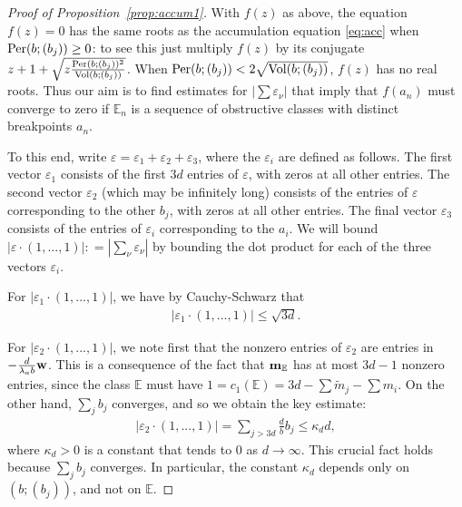 \documentclass[11pt, reqno]{amsart}
\theoremstyle{remark}
\numberwithin{equation}{subsection}
\numberwithin{figure}{section}
\theoremstyle{customremark}
\newcommand{\Vol}{{\rm Vol}}
\newcommand{\Per}{{\rm Per}}
\newcommand{\bbm}{{\bf m}}
\newcommand{\bw}{{\bf w}}
\newcommand{\Tm}{{\widetilde m}}
\newcommand{\bE}{{\mathbb E}}
\newcommand{\ka}{{\kappa}}
\newcommand{\la}{{\lambda}}
\newcommand{\eps}{\varepsilon}
\begin{document}
\begin{proof}[Proof of Proposition~\ref{prop:accum1}]
With $f(z)$ as above, the equation $f(z)=0$ has the same roots as the accumulation equation \eqref{eq:acc} when $\Per(b;(b_j))\ge0$: to see this just multiply $f(z)$ by its conjugate $z+1 + \sqrt {z \frac{\Per(b;(b_j))^2}{\Vol(b;(b_j))}} $. When $\Per(b;(b_j))<2\sqrt{\Vol(b;(b_j))}$, $f(z)$ has no real roots. Thus our aim is to 
find estimates for $|\sum \eps_\nu|$ that imply that $f(a_n)$ must converge to zero if  $\bE_n$ is a sequence of obstructive classes with distinct breakpoints $a_n$.

To this end, write $\eps= \eps_1+\eps_2+\eps_3$, where the $\eps_i$ are defined as follows. The first vector $\eps_1$ consists of the first $3d$
entries of $\eps$, with zeros at all other entries. The second vector $\eps_2$ 
(which may be infinitely long) consists of the entries of $\eps$ corresponding to the other $b_j$, with zeros at all other entries. The final vector $\eps_3$ consists of the entries of $\eps_i$ corresponding to the $a_i$.
We will bound $ |\eps\cdot (1, . . . , 1)|: = |\sum_\nu \eps_\nu|$ by
bounding the dot product for  each of the three vectors $\eps_i$.

For $|\eps_1 \cdot (1, . . . , 1)|$, we have by Cauchy-Schwarz that
\begin{align}\label{eq:eps11}
|\eps_1 \cdot (1, . . . , 1)|\le \sqrt{3d}.
\end{align}

For $|\eps_2\cdot(1,...,1)|$, we note first that the nonzero entries of
$\eps_2$ are entries in $ -\frac{d}{\la_ab} \bw$. This is a consequence of the 
fact that $\bbm_{\bE}$ has at most $3d - 1$ nonzero entries, 
since the class $\bE$ must have $ 1=c_1(\bE)  = 3d - \sum \Tm_j - \sum m_i$.
 On the other hand,  $\sum_j b_j$  converges, and so we obtain the key estimate:
\begin{align}\label{eq:eps12}
|\eps_2 \cdot(1,...,1)| = \sum_{j> 3d} \frac db b_j \le \ka_d d,
\end{align}
where $\ka_d > 0$ is a constant that tends to $0$ as $d\to \infty$. This crucial fact holds because $\sum_j b_j$ converges.  In particular, the constant $\ka_d$ depends only on $(b; (b_j))$, and not on $\bE$.



\end{proof}
\end{document}
